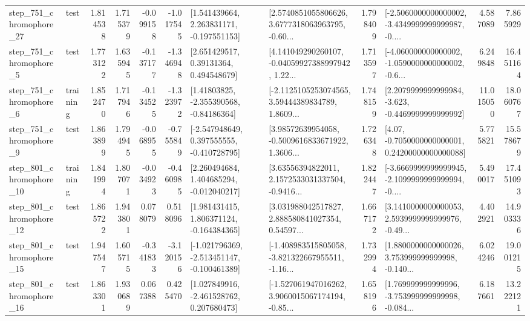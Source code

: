 \begin{tabular}{llrrrrllrlrr}
  step\_751\_chromophore\_27 &      test &      1.814538 &    1.715379 &     -0.099158 & -1.017545 &    [1.541439664, 2.263831171, -0.197551153] &  [2.5740851055806626, 3.6777318063963795, -0.60... &       1.798409 &  [-2.5060000000000002, -3.4349999999999987, -0.... &            4.587089 &          7.865929 \\
   step\_751\_chromophore\_5 &      test &      1.773122 &    1.635945 &     -0.137177 & -1.346948 &      [2.651429517, 0.39131364, 0.494548679] &  [4.141049290260107, -0.04059927388997942, 1.22... &       1.713597 &  [-4.060000000000002, -1.0590000000000002, -0.6... &            6.249848 &         16.451164 \\
   step\_751\_chromophore\_6 &  training &      1.852470 &    1.717946 &     -0.134525 & -1.323972 &     [1.41803825, -2.355390568, -0.84186364] &  [-2.1125105253074565, 3.59444389834789, 1.8609... &       1.748159 &  [2.2079999999999984, -3.623, -0.4469999999999992] &           11.015050 &         18.060767 \\
   step\_751\_chromophore\_9 &      test &      1.863899 &    1.794945 &     -0.068955 & -0.755849 &   [-2.547948649, 0.397555555, -0.410728795] &  [3.98572639954058, -0.5009616833671922, 1.3606... &       1.726348 &   [4.07, -0.7050000000000001, 0.24200000000000088] &            5.775821 &         15.578679 \\
  step\_801\_chromophore\_10 &  training &      1.841994 &    1.807071 &     -0.034923 & -0.460985 &    [2.260494684, 1.404685294, -0.012040217] &  [3.63556394822011, 2.1572533031337504, -0.9416... &       1.822447 &  [-3.6669999999999945, -2.1099999999999994, -0.... &            5.490017 &         17.451093 \\
  step\_801\_chromophore\_12 &      test &      1.865722 &    1.943801 &      0.078079 &  0.518096 &    [1.981431415, 1.806371124, -0.164384365] &  [3.031988042517827, 2.888580841027354, 0.54597... &       1.667172 &  [3.1410000000000053, 2.5939999999999976, -0.49... &            4.402921 &         14.903336 \\
  step\_801\_chromophore\_15 &      test &      1.947547 &    1.605715 &     -0.341833 & -3.120156 &  [-1.021796369, -2.513451147, -0.100461389] &  [-1.408983515805058, -3.821322667955511, -1.16... &       1.732994 &  [1.8800000000000026, 3.753999999999998, -0.140... &            6.024246 &         19.001215 \\
  step\_801\_chromophore\_16 &      test &      1.863301 &    1.930689 &      0.067388 &  0.425470 &    [1.027849916, -2.461528762, 0.207680473] &  [-1.527061947016262, 3.9060015067174194, -0.85... &       1.658196 &  [1.769999999999996, -3.753999999999998, -0.084... &            6.187661 &         13.222121 \\

\end{tabular}
